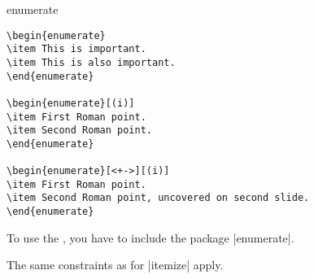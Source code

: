 \begin{environment}{{enumerate}}
  \example
\begin{verbatim}
\begin{enumerate}
\item This is important.
\item This is also important.
\end{enumerate}

\begin{enumerate}[(i)]
\item First Roman point.
\item Second Roman point.
\end{enumerate}

\begin{enumerate}[<+->][(i)]
\item First Roman point.
\item Second Roman point, uncovered on second slide.
\end{enumerate}
\end{verbatim}

  \articlenote
  To use the , you have to include the package
  |enumerate|.  

  \lyxnote
  The same constraints as for |itemize| apply.
\end{environment}



